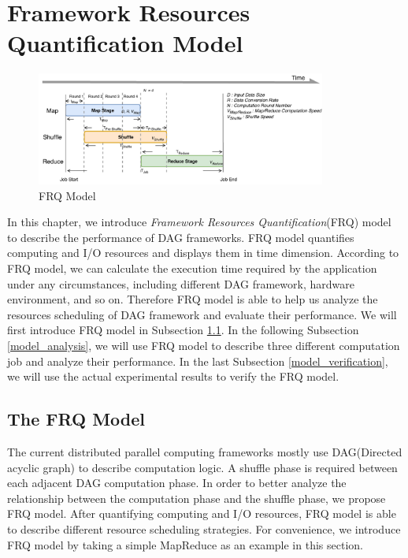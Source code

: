 {\color{blue}
\section{Framework Resources Quantification Model}\label{model}

\begin{figure}
    \centering
	\includegraphics[width=0.85\textwidth]{fig/model_basic}
	\caption{\color{blue}FRQ Model}
    \label{fig:model_basic}
    \vspace{-1em}
\end{figure}

In this chapter, we introduce \textit{Framework Resources Quantification}(FRQ) model to describe the performance of DAG frameworks.
FRQ model quantifies computing and I/O resources and displays them in time dimension. According to FRQ model, we can calculate the execution time required by the application under any circumstances, including different DAG framework, hardware environment, and so on. Therefore FRQ model is able to help us analyze the resources scheduling of DAG framework and evaluate their performance. We will first introduce FRQ model in Subsection \ref{model_overview}. In the following Subsection \ref{model_analysis}, we will use FRQ model to describe three different computation job and analyze their performance. In the last Subsection \ref{model_verification}, we will use the actual experimental results to verify the FRQ model.

\subsection{The FRQ Model}\label{model_overview}
The current distributed parallel computing frameworks mostly use DAG(Directed acyclic graph) to describe computation logic. A shuffle phase is required between each adjacent DAG computation phase. In order to better analyze the relationship between the computation phase and the shuffle phase, we propose FRQ model. After quantifying computing and I/O resources, FRQ model is able to describe different resource scheduling strategies. For convenience, we introduce FRQ model by taking a simple MapReduce as an example in this section.

}
